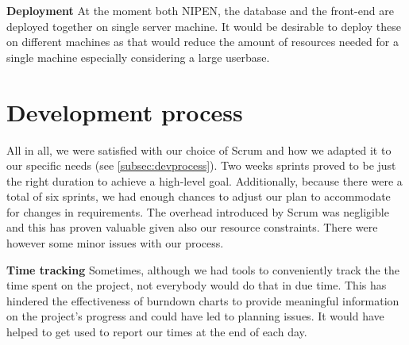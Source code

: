 \textbf{Deployment}\newline
At the moment both NIPEN, the database and the front-end are deployed together on single server machine.
It would be desirable to deploy these on different machines as that would reduce
the amount of resources needed for a single machine especially considering a large userbase.
\iffalse
The actual architecture makes it possible to simply separate the codebase of the backend and the frontend
and deploy them individually. Also, connecting to a database on a different machine can be
achieved by simply modifying the connection address.
\fi

\iffalse
\section{The project}
We were definitely happy with the project's task which led us to study trending topics
like eHealth and self-quantification. Although we had no previous experiences in designing and developing a web API,
we found it interesting and enjoyable. This resulted in a proactive participation by the group
in the improvement and proposal of requirements, a process which in turn made the project even more interesting
for us to work on.

\section{Project management}
Generally, we are satisfied with our project management.
\fi

\section{Development process}
All in all, we were satisfied with our choice of Scrum and how we adapted
it to our specific needs (see \ref{subsec:devprocess}).
Two weeks sprints proved to be just the right duration to achieve
a high-level goal. Additionally, because there were a total of six sprints,
we had enough chances to adjust our plan to accommodate for changes in requirements.
The overhead introduced by Scrum was negligible and this has proven valuable
given also our resource constraints. There were however some minor issues with our process.

\textbf{Time tracking}\newline
Sometimes, although we had tools to conveniently track the the time spent on the project,
not everybody would do that in due time. This has hindered the effectiveness of burndown charts
to provide meaningful information on the project's progress and could have led to planning issues.
It would have helped to get used to report our times at the end of each day.

